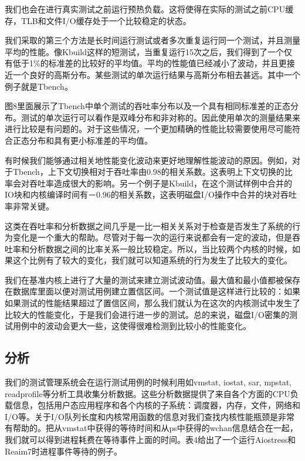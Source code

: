 我们也会在进行真实测试之前运行预热负载。这将使得在实际的测试之前CPU缓存，TLB和文件I/O缓存处于一个比较稳定的状态。

我们采取的第三个方法是长时间运行测试或者多次重复运行同一个测试，并且测量平均的性能。像Kbuild这样的短测试，当重复运行15次之后，我们得到了一个仅有低于1\%的标准差的比较好的平均值。平均的性能值已经减小了波动，并且更接近一个良好的高斯分布。某些测试的单次运行结果与高斯分布相去甚远。其中一个例子就是Tbench。

图8里面展示了Tbench中单个测试的吞吐率分布以及一个具有相同标准差的正态分布。测试的单次运行可以看作是双峰分布和非对称的。因此使用单次的测量结果来进行比较是有问题的。对于这些情况，一个更加精确的性能比较需要使用尽可能符合正态分布和具有更小标准差的平均值。

有时候我们能够通过相关地性能变化波动来更好地理解性能波动的原因。例如，对于Tbench，上下文切换相对于吞吐率由0.98的相关系数。这表明上下文切换的比率会对吞吐率造成很大的影响。另一个例子是Kbuild，在这个测试样例中合并的IO块和内核编译时间有－0.96的相关系数，这表明磁盘I/O操作中合并的块对吞吐率非常关键。

这类在吞吐率和分析数据之间几乎是一比一相关关系对于检查是否发生了系统的行为变化是一个重大的帮助。尽管对于每一次的运行来说都会有一定的波动，但是吞吐率和分析数据之间的比率关系一般比较稳定。所以，当比较两个内核的时候，如果这个比例有了较大的变化，我们就可以知道系统的行为发生了比较大的变化。

我们在基准内核上进行了大量的测试来建立测试波动值。最大值和最小值都被保存在数据库里面以便对测试用例建立置信区间。一个测试值是这样进行比较的：如果如果测试的性能结果超过了置信区间，那么我们就认为在这次的内核测试中发生了比较大的性能变化，于是我们会进行进一步的测试。总的来说，磁盘I/O密集的测试用例中的波动会更大一些，这使得很难检测到比较小的性能变化。


\subsection{分析}
我们的测试管理系统会在运行测试用例的时候利用如vmstat, iostat, sar, mpstat, readprofile等分析工具收集分析数据。这些分析数据提供了来自各个方面的CPU负载信息，包括用户态应用程序和各个内核的子系统：调度器，内存，文件，网络和I/O等。关于I/O队列长度和内核常用函数的信息对我们查找内核性能瓶颈是非常有帮助的。把从vmstat中获得的等待时间和从ps中获得的wchan信息结合在一起，我们就可以得到进程耗费在等待事件上面的时间。表4给出了一个运行Aiostress和Reaim7时进程事件等待的例子。

